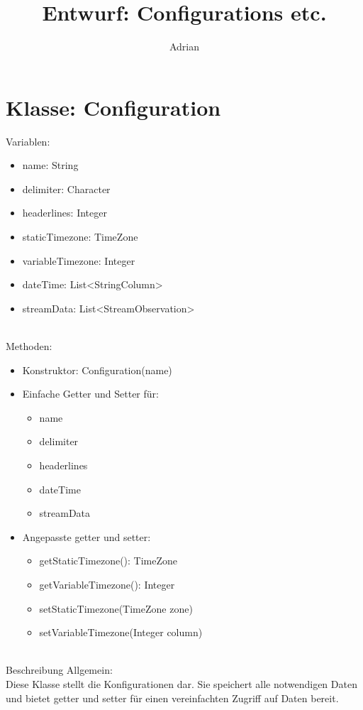 \documentclass[a4paper, 12 pt, titlepage]{article}
\title{Entwurf: Configurations etc.}
\author{Adrian}
\begin{document}
\maketitle

\section{Klasse: Configuration}
Variablen:
\begin{itemize}
	\item name: String
	\item delimiter: Character
	\item headerlines: Integer
	\item staticTimezone: TimeZone
	\item variableTimezone: Integer
	\item dateTime: List<StringColumn>
 	\item streamData: List<StreamObservation>
\end{itemize}
\ \\
Methoden:
\begin{itemize}
	\item Konstruktor: Configuration(name)
	\item Einfache Getter und Setter für:
	\begin{itemize}
		\item name
		\item delimiter
		\item headerlines
		\item dateTime
		\item streamData
	\end{itemize}

	\item Angepasste getter und setter:
	\begin{itemize}
		\item getStaticTimezone(): TimeZone
		\item getVariableTimezone(): Integer
		\item setStaticTimezone(TimeZone zone)
		\item setVariableTimezone(Integer column)
	\end{itemize}
\end{itemize}
\ \\
Beschreibung Allgemein: \\Diese Klasse stellt die Konfigurationen dar. Sie speichert
alle notwendigen Daten und bietet getter und setter für einen vereinfachten Zugriff auf Daten bereit.\\
\end{document}
